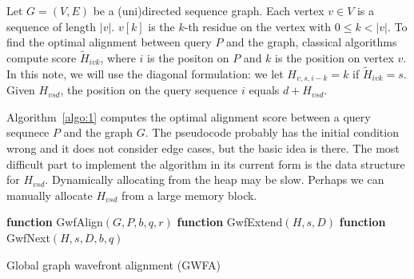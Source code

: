 \documentclass[10pt]{article}
\begin{document}
Let $G=(V,E)$ be a (uni)directed sequence graph.
Each vertex $v\in V$ is a sequence of length $|v|$.
$v[k]$ is the $k$-th residue on the vertex with $0\le k<|v|$.
To find the optimal alignment between query $P$ and the graph,
classical algorithms compute score $\tilde{H}_{ivk}$,
where $i$ is the positon on $P$ and $k$ is the position on vertex $v$.
In this note, we will use the diagonal formulation: we let $H_{v,s,i-k}=k$ if $\tilde{H}_{ivk}=s$.
Given $H_{vsd}$, the position on the query sequence $i$ equals $d+H_{vsd}$.

Algorithm~\ref{algo:1} computes the optimal alignment score between a query sequnece $P$ and the graph $G$.
The pseudocode probably has the initial condition wrong and it does not consider edge cases,
but the basic idea is there.
The most difficult part to implement the algorithm in its current form is the data structure for $H_{vsd}$.
Dynamically allocating from the heap may be slow.
Perhaps we can manually allocate $H_{vsd}$ from a large memory block.

\begin{algorithm}[!hb]
\DontPrintSemicolon
\footnotesize
{}
\BlankLine
\textbf{function} {\sc GwfAlign}$(G,P,b,q,r)$
\textbf{function} {\sc GwfExtend}$(H,s,D)$
\textbf{function} {\sc GwfNext}$(H,s,D,b,q)$
\caption{Global graph wavefront alignment (GWFA)}\label{algo:1}
\end{algorithm}
\end{document}
